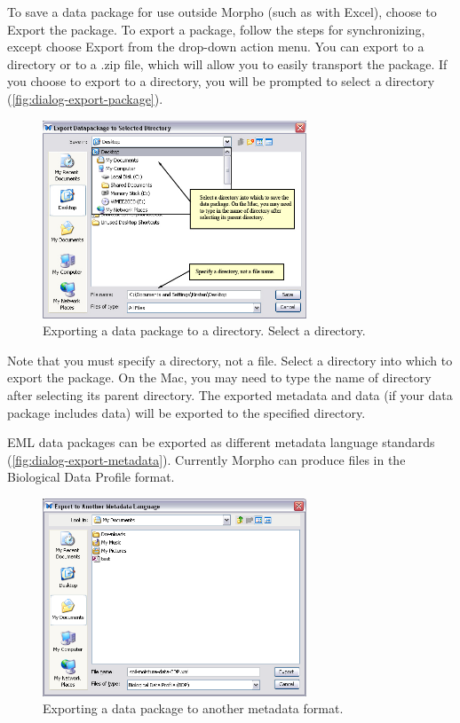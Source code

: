 To save a data package for use outside Morpho (such as with Excel),
choose to Export the package. To export a package, follow the steps for
synchronizing, except choose Export from the drop-down action menu. You
can export to a directory or to a .zip file, which will allow you to
easily transport the package. If you choose to export to a directory,
you will be prompted to select a directory
(\autoref{fig:dialog-export-package}).

\begin{figure}
  \centering
    \includegraphics[width=0.7\textwidth]{images/dialog-export-package.jpg}
  \caption{Exporting a data package to a directory. Select a directory.}
  \label{fig:dialog-export-package}
\end{figure}

Note that you must specify a directory, not a file. Select a directory
into which to export the package. On the Mac, you may need to type the
name of directory after selecting its parent directory. The exported
metadata and data (if your data package includes data) will be exported
to the specified directory.

EML data packages can be exported as different metadata language
standards (\autoref{fig:dialog-export-metadata}). Currently Morpho can
produce files in the Biological Data Profile format.

\begin{figure}
  \centering
    \includegraphics[width=0.7\textwidth]{images/dialog-export-metadata.png}
  \caption{Exporting a data package to another metadata format.}
  \label{fig:dialog-export-metadata}
\end{figure}

